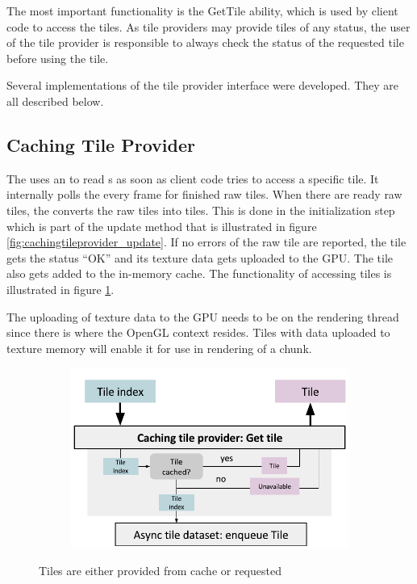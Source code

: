 The most important functionality is the GetTile ability, which is used by client code to access the tiles. As tile providers may provide tiles of any status, the user of the tile provider is responsible to always check the status of the requested tile before using the tile. 

Several implementations of the tile provider interface were developed. They are all described below.

\subsection{Caching Tile Provider}
The  uses an  to read s as soon as client code tries to access a specific tile. It internally polls the  every frame for finished raw tiles. When there are ready raw tiles, the  converts the raw tiles into tiles. This is done in the initialization step which is part of the update method that is illustrated in figure \ref{fig:cachingtileprovider_update}. If no errors of the raw tile are reported, the tile gets the status ``OK'' and its texture data gets uploaded to the GPU. The tile also gets added to the in-memory cache. The functionality of accessing tiles is illustrated in figure \ref{fig:cachingtileprovider_gettile}.

The uploading of texture data to the GPU needs to be on the rendering thread since there is where the OpenGL context resides. Tiles with data uploaded to texture memory will enable it for use in rendering of a chunk.

\begin{figure}[htbp]
    \centering
    \begin{subfigure}[bt]{0.7\textwidth}
        \includegraphics[width=\textwidth]{figures/implementation/tileprovider/cachingtileprovider_gettile.pdf}
    \end{subfigure}
    \caption{Tiles are either provided from cache or requested}
    \label{fig:cachingtileprovider_gettile}
\end{figure}

